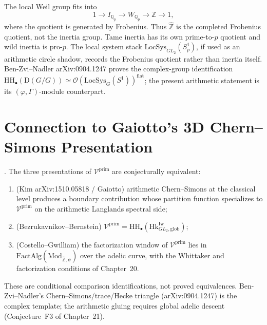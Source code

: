 \begin{remark}
The local Weil group fits into
\[
1\longrightarrow I_{\mathbb{Q}_{p}}\longrightarrow W_{\mathbb{Q}_{p}}
\longrightarrow \mathbb{Z}\longrightarrow 1,
\]
where the quotient is generated by Frobenius. Thus
\(\widehat{\mathbb{Z}}\) is the completed Frobenius quotient, not the
inertia group. Tame inertia has its own prime-to-\(p\) quotient and
wild inertia is pro-\(p\). The local system stack
\(\mathrm{LocSys}_{GL_{2}}(S^1_p)\), if used as an arithmetic circle
shadow, records the Frobenius quotient rather than inertia itself.
Ben-Zvi--Nadler arXiv:0904.1247 proves the
complex-group identification \(\mathrm{HH}_\bullet(\mathrm{D}(G/G))\simeq \mathcal{O}(\mathrm{LocSys}_G(S^1))^{\mathrm{flat}}\);
the present arithmetic statement is its \((\varphi,\Gamma)\)-module counterpart.
\end{remark}

\section{Connection to Gaiotto's 3D Chern--Simons Presentation}
\label{v4-arith:bb:connection-gaiotto}

\begin{proposition}
\label{v4-arith:prop:three-way-equivalence}
\ClaimStatusConjectured. The three presentations of
\(\mathcal{V}^{\mathrm{prim}}\) are conjecturally equivalent:
\begin{enumerate}
\item (Kim arXiv:1510.05818 / Gaiotto) arithmetic Chern--Simons at the classical
level produces a boundary contribution whose partition function specializes to
\(\mathcal{V}^{\mathrm{prim}}\) on the arithmetic Langlands spectral side;
\item (Bezrukavnikov--Bernstein) \(\mathcal{V}^{\mathrm{prim}}=\mathrm{HH}_{\bullet}(\mathrm{Hk}^{\mathrm{Iw}}_{GL_{2},\mathrm{glob}})\);
\item (Costello--Gwilliam) the factorization window of
\(\mathcal{V}^{\mathrm{prim}}\) lies in
\(\mathrm{FactAlg}(\mathrm{Mod}_{\widehat{\mathbb{Z}},\psi})\) over the
adelic curve, with the Whittaker and factorization conditions of
Chapter~20.
\end{enumerate}
These are conditional comparison identifications, not proved equivalences.
Ben-Zvi--Nadler's Chern--Simons/trace/Hecke triangle (arXiv:0904.1247) is the
complex template; the arithmetic gluing requires global adelic descent (Conjecture~F3
of Chapter~21).
\end{proposition}

